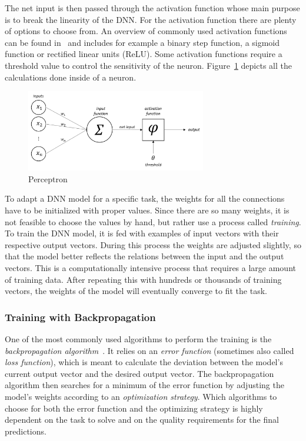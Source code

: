 The net input is then passed through the activation function whose main purpose is to break the linearity of the DNN. For the activation function there are plenty of options to choose from. An overview of commonly used activation functions can be found in~\cite{act_funcs18} and includes for example a binary step function, a sigmoid function or rectified linear units (ReLU). Some activation functions require a threshold value to control the sensitivity of the neuron. Figure~\ref{fig:perceptron} depicts all the calculations done inside of a neuron.

\begin{figure}[h]
    \centering
    \includegraphics[width=0.7\textwidth]{images/perceptron}
    \caption{Perceptron}
    \label{fig:perceptron}
\end{figure}

To adapt a DNN model for a specific task, the weights for all the connections have to be initialized with proper values. Since there are so many weights, it is not feasible to choose the values by hand, but rather use a process called \emph{training}. To train the DNN model, it is fed with examples of input vectors with their respective output vectors. During this process the weights are adjusted slightly, so that the model better reflects the relations between the input and the output vectors. This is a computationally intensive process that requires a large amount of training data. After repeating this with hundreds or thousands of training vectors, the weights of the model will eventually converge to fit the task.

\subsubsection{Training with Backpropagation}
One of the most commonly used algorithms to perform the training is the \emph{backpropagation algorithm}~\cite[pp.~151ff]{nn_intro96}. It relies on an \emph{error function} (sometimes also called \emph{loss function}), which is meant to calculate the deviation between the model's current output vector and the desired output vector. The backpropagation algorithm then searches for a minimum of the error function by adjusting the model's weights according to an \emph{optimization strategy}. Which algorithms to choose for both the error function and the optimizing strategy is highly dependent on the task to solve and on the quality requirements for the final predictions.

